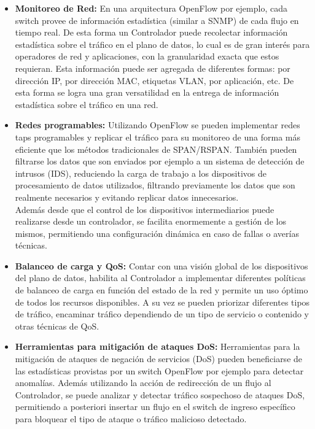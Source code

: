 \begin{itemize}

\item \textbf{Monitoreo de Red:}
En una arquitectura OpenFlow por ejemplo, cada switch provee de información estadística (similar a SNMP) de cada flujo en tiempo real. De esta forma un Controlador puede recolectar información estadística sobre el tráfico en el plano de datos, lo cual es de gran interés para operadores de red y aplicaciones, con la granularidad exacta que estos requieran. Esta información puede ser agregada de diferentes formas: por dirección IP, por dirección MAC, etiquetas VLAN, por aplicación, etc. De esta forma se logra una gran versatilidad en la entrega de información estadística sobre el tráfico en una red.

\item \textbf{Redes  programables:}
Utilizando OpenFlow se pueden implementar redes taps programables y replicar el tráfico para su monitoreo de una forma más eficiente que los métodos tradicionales de SPAN/RSPAN. También pueden filtrarse los datos que son enviados por ejemplo a un sistema de detección de intrusos (IDS), reduciendo la carga de trabajo a los dispositivos de procesamiento de datos utilizados, filtrando previamente los datos que son realmente necesarios y evitando replicar datos innecesarios.\\
Además desde que el control de los dispositivos intermediarios puede realizarse desde un controlador, se facilita enormemente a gestión de los mismos, permitiendo una configuración dinámica en caso de fallas o averías técnicas.

\item \textbf{Balanceo de carga y QoS:}
Contar con una visión global de los dispositivos del plano de datos, habilita al Controlador a implementar diferentes políticas de balanceo de carga en función del estado de la red y permite un uso óptimo de todos los recursos disponibles. A su vez se pueden priorizar diferentes tipos de tráfico, encaminar tráfico dependiendo de un tipo de servicio o contenido y otras técnicas de QoS.

\item \textbf{Herramientas para mitigación de ataques DoS:}
Herramientas para la mitigación de ataques de negación de servicios (DoS) pueden beneficiarse de las estadísticas provistas por un switch OpenFlow por ejemplo para detectar anomalías. Además utilizando la acción de redirección de un flujo al Controlador, se puede analizar y detectar tráfico sospechoso de ataques DoS, permitiendo a posteriori insertar un flujo en el switch de ingreso específico para bloquear el tipo de ataque o tráfico malicioso detectado.


\end{itemize}
